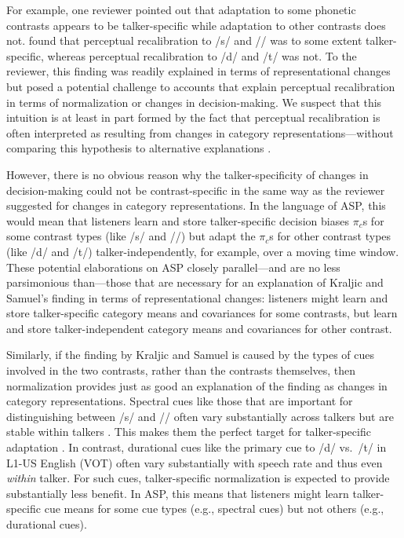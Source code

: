 \documentclass[
  11pt,
  man,floatsintext]{apa6}
\begin{document}
For example, one reviewer pointed out that adaptation to some phonetic contrasts appears to be talker-specific while adaptation to other contrasts does not. \textcite{kraljic-samuel2007} found that perceptual recalibration to /s/ and // was to some extent talker-specific, whereas perceptual recalibration to /d/ and /t/ was not. To the reviewer, this finding was readily explained in terms of representational changes but posed a potential challenge to accounts that explain perceptual recalibration in terms of normalization or changes in decision-making. We suspect that this intuition is at least in part formed by the fact that perceptual recalibration is often interpreted as resulting from changes in category representations---without comparing this hypothesis to alternative explanations \autocite[for related discussion, see also][]{zheng-samuel2020}.

However, there is no obvious reason why the talker-specificity of changes in decision-making could not be contrast-specific in the same way as the reviewer suggested for changes in category representations. In the language of ASP, this would mean that listeners learn and store talker-specific decision biases \(\pi_c\)s for some contrast types (like /s/ and //) but adapt the \(\pi_c\)s for other contrast types (like /d/ and /t/) talker-independently, for example, over a moving time window. These potential elaborations on ASP closely parallel---and are no less parsimonious than---those that are necessary for an explanation of Kraljic and Samuel's finding in terms of representational changes: listeners might learn and store talker-specific category means and covariances for some contrasts, but learn and store talker-independent category means and covariances for other contrast.

Similarly, if the finding by Kraljic and Samuel is caused by the types of cues involved in the two contrasts, rather than the contrasts themselves, then normalization provides just as good an explanation of the finding as changes in category representations. Spectral cues like those that are important for distinguishing between /s/ and // often vary substantially across talkers but are stable within talkers \autocite[e.g.,][]{heald-nusbaum2015}. This makes them the perfect target for talker-specific adaptation \autocite[see][]{kleinschmidt-jaeger2015}. In contrast, durational cues like the primary cue to /d/ vs.~/t/ in L1-US English (VOT) often vary substantially with speech rate and thus even \emph{within} talker. For such cues, talker-specific normalization is expected to provide substantially less benefit. In ASP, this means that listeners might learn talker-specific cue means for some cue types (e.g., spectral cues) but not others (e.g., durational cues).
\end{document}
